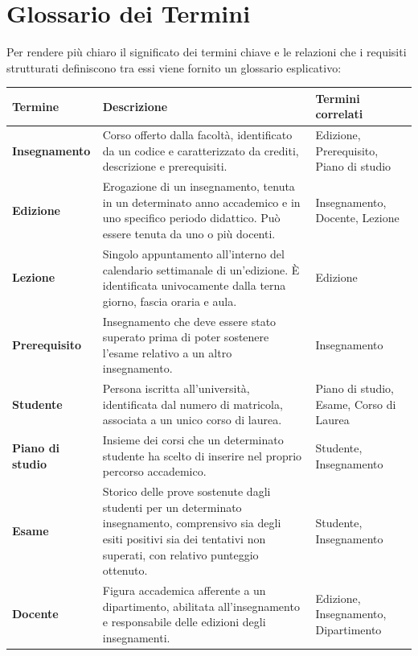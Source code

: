 \section{Glossario dei Termini}

Per rendere più chiaro il significato dei termini chiave e le relazioni 
che i requisiti strutturati definiscono tra essi viene fornito un glossario esplicativo:

\vspace{0.5cm}

\begin{table}[h]
    \centering
    \renewcommand{\arraystretch}{1.4} 
    \begin{tabular}{|p{3cm}|p{7.5cm}|p{3.5cm}|}
        \hline
        \textbf{Termine} & \textbf{Descrizione} & \textbf{Termini correlati} \\
        \hline
        \textbf{Insegnamento} & Corso offerto dalla facoltà, identificato da un codice e caratterizzato da crediti, descrizione e prerequisiti. & Edizione, Prerequisito, Piano di studio \\
        \hline
        \textbf{Edizione} & Erogazione di un insegnamento, tenuta in un determinato anno accademico e in uno specifico periodo didattico. Può essere tenuta da uno o più docenti. & Insegnamento, Docente, Lezione \\
        \hline
        \textbf{Lezione} & Singolo appuntamento all'interno del calendario settimanale di un'edizione. È identificata univocamente dalla terna giorno, fascia oraria e aula. & Edizione \\
        \hline
        \textbf{Prerequisito} & Insegnamento che deve essere stato superato prima di poter sostenere l'esame relativo a un altro insegnamento. & Insegnamento \\
        \hline
        \textbf{Studente} & Persona iscritta all'università, identificata dal numero di matricola, associata a un unico corso di laurea. & Piano di studio, Esame, Corso di Laurea \\
        \hline
        \textbf{Piano di studio} & Insieme dei corsi che un determinato studente ha scelto di inserire nel proprio percorso accademico. & Studente, Insegnamento \\
        \hline
        \textbf{Esame} & Storico delle prove sostenute dagli studenti per un determinato insegnamento, comprensivo sia degli esiti positivi sia dei tentativi non superati, con relativo punteggio ottenuto. & Studente, Insegnamento \\
        \hline
        \textbf{Docente} & Figura accademica afferente a un dipartimento, abilitata all'insegnamento e responsabile delle edizioni degli insegnamenti. & Edizione, Insegnamento, Dipartimento \\

\end{tabular}
\end{table}
